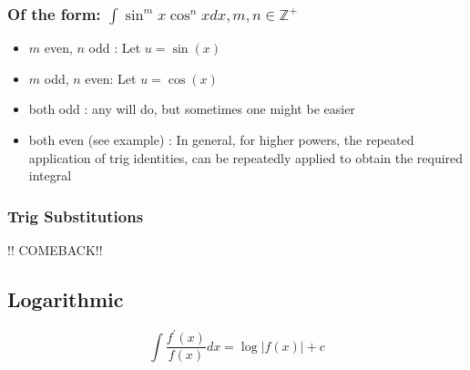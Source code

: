 \documentclass[english,course]{Notes}
\begin{document}
\subsubsection{Of the form: $\int \sin ^{m} x \cos ^{n} x d x, m, n \in \mathbb{Z}^{+}$}

\begin{itemize}
	\item[] $m$ even, $n$ odd : Let $u = \sin(x)$
	\item[] $m$ odd, $n$ even: Let $u = \cos(x)$
	\item[] both odd : any will do, but sometimes one might be easier
	\item[] both even (see example) : In general, for higher powers, the repeated application of trig identities, can be repeatedly applied to obtain the required integral
	\end{itemize}
	

\subsubsection{Trig Substitutions} !! COMEBACK!!

\subsection{Logarithmic}

\begin{theorem} $$ \int \frac{f^{\prime}(x)}{f(x)} d x=\log |f(x)|+c $$ \end{theorem}

\end{document}
